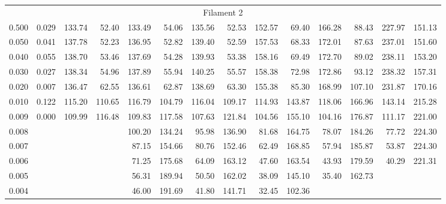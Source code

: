 \begin{tabular}{@{}lrrrrrrrrrrrrr@{}}
\midrule
\multicolumn{14}{c}{Filament 2} \\
\cmidrule{1-14}
0.500 & 0.029 & 133.74 &  52.40 & 133.49 &  54.06 & 135.56 &  52.53 & 152.57 & 69.40 & 166.28 & 88.43 & 227.97 & 151.13 \\
0.050 & 0.041 & 137.78 &  52.23 & 136.95 &  52.82 & 139.40 &  52.59 & 157.53 & 68.33 & 172.01 & 87.63 & 237.01 & 151.60 \\
0.040 & 0.055 & 138.70 &  53.46 & 137.69 &  54.28 & 139.93 &  53.38 & 158.16 & 69.49 & 172.70 & 89.02 & 238.11 & 153.20 \\
0.030 & 0.027 & 138.34 &  54.96 & 137.89 &  55.94 & 140.25 &  55.57 & 158.38 & 72.98 & 172.86 & 93.12 & 238.32 & 157.31 \\
0.020 & 0.007 & 136.47 &  62.55 & 136.61 &  62.87 & 138.69 &  63.30 & 155.38 & 85.30 & 168.99 & 107.10 & 231.87 & 170.16 \\
0.010 & 0.122 & 115.20 & 110.65 & 116.79 & 104.79 & 116.04 & 109.17 & 114.93 & 143.87 & 118.06 & 166.96 & 143.14 & 215.28 \\
0.009 & 0.000 & 109.99 & 116.48 & 109.83 & 117.58 & 107.63 & 121.84 & 104.56 & 155.10 & 104.16 & 176.87 & 111.17 & 221.00 \\
0.008 &       &        &        & 100.20 & 134.24 &  95.98 & 136.90 &  81.68 & 164.75 & 78.07 & 184.26 & 77.72 & 224.30 \\
0.007 &       &        &        &  87.15 & 154.66 &  80.76 & 152.46 &  62.49 & 168.85 & 57.94 & 185.87 & 53.87 & 224.30 \\
0.006 &       &        &        &  71.25 & 175.68 &  64.09 & 163.12 &  47.60 & 163.54 & 43.93 & 179.59 & 40.29 & 221.31 \\
0.005 &       &        &        &  56.31 & 189.94 &  50.50 & 162.02 &  38.09 & 145.10 & 35.40 & 162.73 &       &             \\
0.004 &       &        &        &  46.00 & 191.69 &  41.80 & 141.71 &  32.45 & 102.36 &       &             &       &             \\


\end{tabular}
